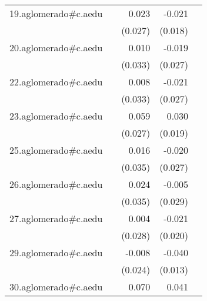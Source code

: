 {\begin{longtable}{l*{4}{D{.}{.}{-1}}}
\addlinespace
19.aglomerado#c.aedu&                     &       0.023         &      -0.021         &                     \\
            &                     &     (0.027)         &     (0.018)         &                     \\
\addlinespace
20.aglomerado#c.aedu&                     &       0.010         &      -0.019         &                     \\
            &                     &     (0.033)         &     (0.027)         &                     \\
\addlinespace
22.aglomerado#c.aedu&                     &       0.008         &      -0.021         &                     \\
            &                     &     (0.033)         &     (0.027)         &                     \\
\addlinespace
23.aglomerado#c.aedu&                     &       0.059\sym{*}  &       0.030         &                     \\
            &                     &     (0.027)         &     (0.019)         &                     \\
\addlinespace
25.aglomerado#c.aedu&                     &       0.016         &      -0.020         &                     \\
            &                     &     (0.035)         &     (0.027)         &                     \\
\addlinespace
26.aglomerado#c.aedu&                     &       0.024         &      -0.005         &                     \\
            &                     &     (0.035)         &     (0.029)         &                     \\
\addlinespace
27.aglomerado#c.aedu&                     &       0.004         &      -0.021         &                     \\
            &                     &     (0.028)         &     (0.020)         &                     \\
\addlinespace
29.aglomerado#c.aedu&                     &      -0.008         &      -0.040\sym{**} &                     \\
            &                     &     (0.024)         &     (0.013)         &                     \\
\addlinespace
30.aglomerado#c.aedu&                     &       0.070\sym{*}  &       0.041         &                     \\

\end{longtable}}
